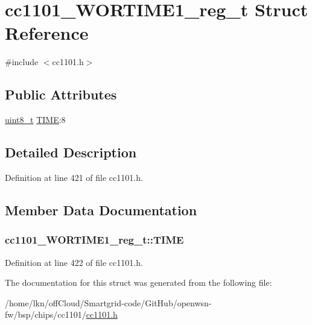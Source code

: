 \hypertarget{structcc1101___w_o_r_t_i_m_e1__reg__t}{}\section{cc1101\+\_\+\+W\+O\+R\+T\+I\+M\+E1\+\_\+reg\+\_\+t Struct Reference}
\label{structcc1101___w_o_r_t_i_m_e1__reg__t}


{\ttfamily \#include $<$cc1101.\+h$>$}

\subsection*{Public Attributes}
\begin{DoxyCompactItemize}
\item 
\hyperlink{_p_e___types_8h_aba7bc1797add20fe3efdf37ced1182c5}{uint8\+\_\+t} \hyperlink{structcc1101___w_o_r_t_i_m_e1__reg__t_a74252cf27092bea575b451ebd3358f76}{T\+I\+ME}\+:8
\end{DoxyCompactItemize}


\subsection{Detailed Description}


Definition at line 421 of file cc1101.\+h.



\subsection{Member Data Documentation}
\subsubsection[{\texorpdfstring{T\+I\+ME}{TIME}}]{ cc1101\+\_\+\+W\+O\+R\+T\+I\+M\+E1\+\_\+reg\+\_\+t\+::\+T\+I\+ME}\hypertarget{structcc1101___w_o_r_t_i_m_e1__reg__t_a74252cf27092bea575b451ebd3358f76}{}\label{structcc1101___w_o_r_t_i_m_e1__reg__t_a74252cf27092bea575b451ebd3358f76}


Definition at line 422 of file cc1101.\+h.



The documentation for this struct was generated from the following file\+:\begin{DoxyCompactItemize}
\item 
/home/lkn/off\+Cloud/\+Smartgrid-\/code/\+Git\+Hub/openwsn-\/fw/bsp/chips/cc1101/\hyperlink{cc1101_8h}{cc1101.\+h}\end{DoxyCompactItemize}
